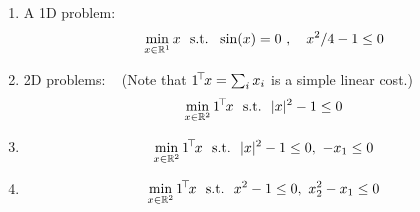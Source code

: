 \begin{enumerate}
	\item A 1D problem:
	$$\min_{x\in{\mathbb{R}}^1} x ~~\text{s.t.}~~ \sin(x)=0~,\quad x^2/4-1\le 0$$
	
	\item 2D problems: ~ (Note that $1^{\!\top\!} x = \sum_i x_i$ is a simple linear cost.)
	$$\min_{x\in{\mathbb{R}}^2} 1^{\!\top\!} x ~~\text{s.t.}~~ |x|^2-1 \le 0$$
	
	\item 
	$$\min_{x\in{\mathbb{R}}^2} 1^{\!\top\!} x ~~\text{s.t.}~~ |x|^2-1 \le 0,~ -x_1\le 0$$
	
	
	
	\item
	$$\min_{x\in{\mathbb{R}}^2} 1^{\!\top\!} x ~~\text{s.t.}~~ x^2-1 \le 0,~ x_2^2-x_1 \le0$$
\end{enumerate}




\exerfoot
